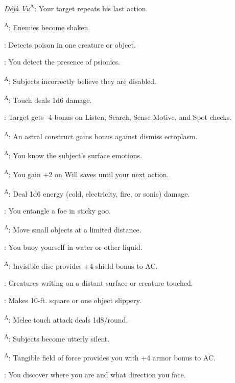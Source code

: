 \noindent\textit{\hyperref[psionic:Deja Vu]{Déjà Vu}}\textsuperscript{A}: Your target repeats his last action.

\textsuperscript{A}: Enemies become shaken.

: Detects poison in one creature or object.

: You detect the presence of psionics.

\textsuperscript{A}: Subjects incorrectly believe they are disabled.

\textsuperscript{A}: Touch deals 1d6 damage.

: Target gets -4 bonus on Listen, Search, Sense Motive, and Spot checks.

\textsuperscript{A}: An astral construct gains bonus against dismiss ectoplasm.

\textsuperscript{A}: You know the subject’s surface emotions.

\textsuperscript{A}: You gain +2 on Will saves until your next action.

\textsuperscript{A}: Deal 1d6 energy (cold, electricity, fire, or sonic) damage.

: You entangle a foe in sticky goo.

\textsuperscript{A}: Move small objects at a limited distance.

: You buoy yourself in water or other liquid.

\textsuperscript{A}: Invisible disc provides +4 shield bonus to AC.

: Creatures writing on a distant surface or creature touched.

: Makes 10-ft. square or one object slippery.

\textsuperscript{A}: Melee touch attack deals 1d8/round.

\textsuperscript{A}: Subjects become utterly silent.

\textsuperscript{A}: Tangible field of force provides you with +4 armor bonus to AC.

: You discover where you are and what direction you face.

